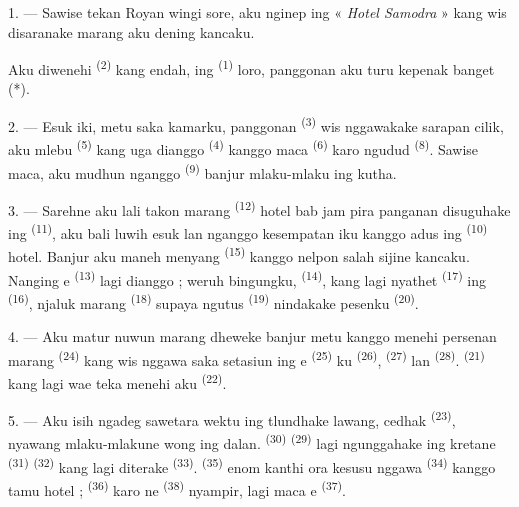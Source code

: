 \textit{}

\VUsaut{3.0mm}
\VUsaut{1.6mm}
\VUsaut{2.0mm}
\VUsaut{3.4mm}

1. --- Sawise tekan Royan wingi sore, aku nginep ing
« \textit{Hotel Samodra} » kang wis disaranake marang aku dening
kancaku.

Aku diwenehi  \textsuperscript{(2)} kang endah, ing
 \textsuperscript{(1)} loro, panggonan aku turu kepenak
banget (*).

2. --- Esuk iki, metu saka kamarku, panggonan 
\textsuperscript{(3)} wis nggawakake sarapan cilik, aku mlebu
 \textsuperscript{(5)} kang uga dianggo  \textsuperscript{(4)} kanggo maca 
\textsuperscript{(6)} karo ngudud  \textsuperscript{(8)}.
Sawise maca, aku mudhun nganggo  \textsuperscript{(9)} banjur
mlaku-mlaku ing kutha.

3. --- Sarehne aku lali takon marang 
\textsuperscript{(12)} hotel bab jam pira panganan disuguhake ing
 \textsuperscript{(11)}, aku bali luwih esuk lan
nganggo kesempatan iku kanggo adus ing 
\textsuperscript{(10)} hotel. Banjur aku maneh menyang  \textsuperscript{(15)} kanggo nelpon salah sijine kancaku. Nanging
e \textsuperscript{(13)} lagi dianggo ; weruh bingungku,
 \textsuperscript{(14)}, kang lagi nyathet
 \textsuperscript{(17)} ing 
\textsuperscript{(16)}, njaluk marang 
\textsuperscript{(18)} supaya ngutus 
\textsuperscript{(19)} nindakake pesenku 
\textsuperscript{(20)}.

4. --- Aku matur nuwun marang dheweke banjur metu kanggo menehi
persenan marang  \textsuperscript{(24)} kang wis nggawa saka
setasiun ing e \textsuperscript{(25)}
ku \textsuperscript{(26)}, 
\textsuperscript{(27)} lan  \textsuperscript{(28)}.
 \textsuperscript{(21)} kang lagi wae teka menehi
aku  \textsuperscript{(22)}.

5. --- Aku isih ngadeg sawetara wektu ing tlundhake lawang, cedhak
 \textsuperscript{(23)}, nyawang mlaku-mlakune wong
ing dalan.  \textsuperscript{(30)} 
\textsuperscript{(29)} lagi ngunggahake ing kretane 
\textsuperscript{(31)}  \textsuperscript{(32)} kang
lagi diterake  \textsuperscript{(33)}.
 \textsuperscript{(35)} enom kanthi ora
kesusu nggawa  \textsuperscript{(34)} kanggo tamu hotel ;
 \textsuperscript{(36)} karo ne
\textsuperscript{(38)} nyampir, lagi maca e
\textsuperscript{(37)}.

